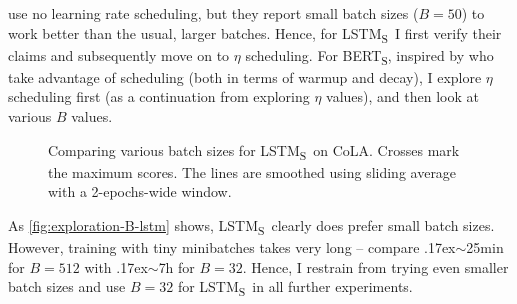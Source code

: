\documentclass[bsc,frontabs,twoside,singlespacing,parskip,deptreport]{infthesis}
\def\mytilde{{\raise.17ex\hbox{$\scriptstyle\sim$}}}
\def\BERTS{BERT\textsubscript{S}}
\def\LSTMS{LSTM\textsubscript{S}}
\def\sliding{The lines are smoothed using sliding average with a 2-epochs-wide window.}
\begin{document}
{{{      \citet{Tang_2019a} use no learning rate scheduling, but they report small batch sizes ($B=50$) to work better than the usual, larger batches. Hence, for \LSTMS~I first verify their claims and subsequently move on to $\eta$ scheduling. For \BERTS, inspired by \citet{Sanh_2019} who take advantage of scheduling (both in terms of warmup and decay), I explore $\eta$ scheduling first (as a continuation from exploring $\eta$ values), and then look at various $B$ values.

      \begin{figure}[h!t]
        \centering
        \caption{Comparing various batch sizes for \LSTMS~on CoLA. Crosses mark the maximum scores. \sliding}
        \label{fig:exploration-B-lstm}
      \end{figure}

      As \autoref{fig:exploration-B-lstm} shows, \LSTMS~clearly does prefer small batch sizes. However, training with tiny minibatches takes very long -- compare \mytilde25min for $B=512$ with \mytilde7h for $B=32$. Hence, I restrain from trying even smaller batch sizes and use $B=32$ for \LSTMS~in all further experiments.

}}}
\end{document}
